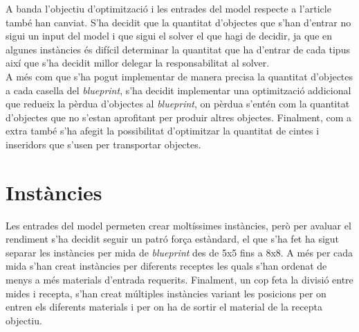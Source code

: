 A banda l'objectiu d'optimització i les entrades del model respecte a l'article \cite{arxivpaper} també han canviat. S'ha decidit que la quantitat d'objectes que s'han d'entrar no sigui un input del model i que sigui el solver el que hagi de decidir, ja que en algunes instàncies és difícil determinar la quantitat que ha d'entrar de cada tipus així que s'ha decidit millor delegar la responsabilitat al solver.\\
A més com que s'ha pogut implementar de manera precisa la quantitat d'objectes a cada casella del \textit{blueprint}, s'ha decidit implementar una optimització addicional que redueix la pèrdua d'objectes al \textit{blueprint}, on pèrdua s'entén com la quantitat d'objectes que no s'estan aprofitant per produir altres objectes. Finalment, com a extra també s'ha afegit la possibilitat d'optimitzar la quantitat de cintes i inseridors que s'usen per transportar objectes.

\section{Instàncies}
Les entrades del model permeten crear moltíssimes instàncies, però per avaluar el rendiment s'ha decidit seguir un patró força estàndard, el que s'ha fet ha sigut separar les instàncies per mida de \textit{blueprint} des de 5x5 fins a 8x8. A més per cada mida s'han creat instàncies per diferents receptes les quals s'han ordenat de menys a més materials d'entrada requerits. Finalment, un cop feta la divisió entre mides i recepta, s'han creat múltiples instàncies variant les posicions per on entren els diferents materials i per on ha de sortir el material de la recepta objectiu.
